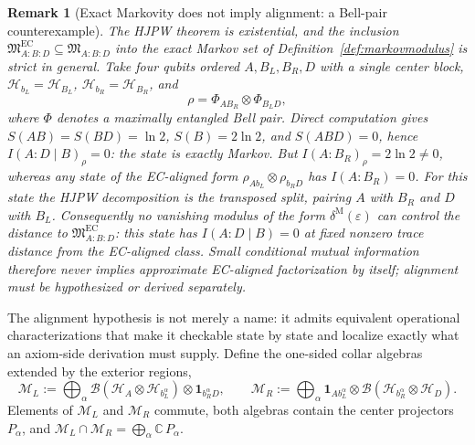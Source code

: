 \documentclass[11pt]{article}
\newtheorem{remark}[theorem]{Remark}
\begin{document}
\begin{remark}[Exact Markovity does not imply alignment: a Bell-pair counterexample]\label{rem:hjpwalignment}
The HJPW theorem is existential, and the inclusion \(\mathfrak M^{\mathrm{EC}}_{A:B:D}\subseteq\mathfrak M_{A:B:D}\) into the exact Markov set of Definition~\ref{def:markovmodulus} is strict in general. Take four qubits ordered \(A,B_L,B_R,D\) with a single center block, \(\mathcal H_{b_L}=\mathcal H_{B_L}\), \(\mathcal H_{b_R}=\mathcal H_{B_R}\), and
\[
\rho=\Phi_{A B_R}\otimes\Phi_{B_L D},
\]
where \(\Phi\) denotes a maximally entangled Bell pair. Direct computation gives \(S(AB)=S(BD)=\ln 2\), \(S(B)=2\ln 2\), and \(S(ABD)=0\), hence \(I(A:D\mid B)_\rho=0\): the state is exactly Markov. But \(I(A:B_R)_\rho=2\ln 2\neq 0\), whereas any state of the EC-aligned form \(\rho_{A b_L}\otimes\rho_{b_R D}\) has \(I(A:B_R)=0\). For this state the HJPW decomposition is the transposed split, pairing \(A\) with \(B_R\) and \(D\) with \(B_L\). Consequently no vanishing modulus of the form \(\delta^{\mathrm M}(\varepsilon)\) can control the distance to \(\mathfrak M^{\mathrm{EC}}_{A:B:D}\): this state has \(I(A:D\mid B)=0\) at fixed nonzero trace distance from the EC-aligned class. Small conditional mutual information therefore never implies approximate EC-aligned factorization by itself; alignment must be hypothesized or derived separately.
\end{remark}

The alignment hypothesis is not merely a name: it admits equivalent operational characterizations that make it checkable state by state and localize exactly what an axiom-side derivation must supply. Define the one-sided collar algebras extended by the exterior regions,
\[
\mathcal M_L:=\bigoplus_\alpha \mathcal B(\mathcal H_A\otimes\mathcal H_{b_L^\alpha})\otimes\mathbf 1_{b_R^\alpha D},
\qquad
\mathcal M_R:=\bigoplus_\alpha \mathbf 1_{A b_L^\alpha}\otimes\mathcal B(\mathcal H_{b_R^\alpha}\otimes\mathcal H_D).
\]
Elements of \(\mathcal M_L\) and \(\mathcal M_R\) commute, both algebras contain the center projectors \(P_\alpha\), and \(\mathcal M_L\cap\mathcal M_R=\bigoplus_\alpha\mathbb C\,P_\alpha\).
\end{document}
